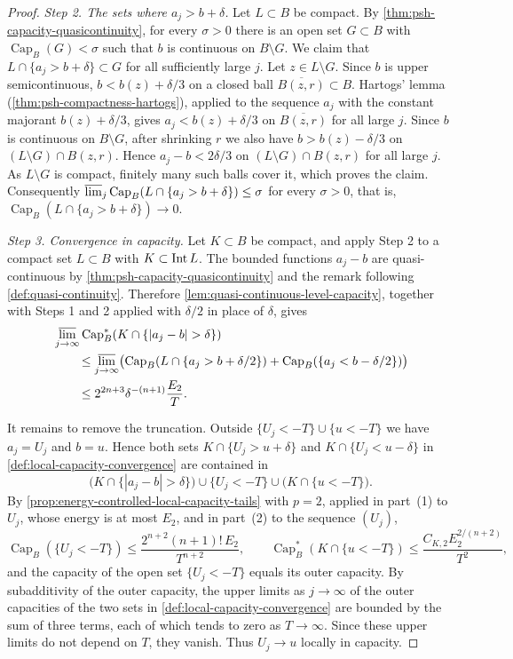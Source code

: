 \begin{proof}
\emph{Step 2. The sets where $a_j>b+\delta$.}
Let $L\subset B$ be compact. By \cref{thm:psh-capacity-quasicontinuity}, for every $\sigma>0$ there is an open set $G\subset B$ with $\operatorname{Cap}_B(G)<\sigma$ such that $b$ is continuous on $B\setminus G$. We claim that $L\cap\{a_j>b+\delta\}\subset G$ for all sufficiently large $j$. Let $z\in L\setminus G$. Since $b$ is upper semicontinuous, $b<b(z)+\delta/3$ on a closed ball $\overline{B(z,r)}\subset B$. Hartogs' lemma (\cref{thm:psh-compactness-hartogs}), applied to the sequence $a_j$ with the constant majorant $b(z)+\delta/3$, gives $a_j<b(z)+\delta/3$ on $\overline{B(z,r)}$ for all large $j$. Since $b$ is continuous on $B\setminus G$, after shrinking $r$ we also have $b>b(z)-\delta/3$ on $(L\setminus G)\cap B(z,r)$. Hence $a_j-b<2\delta/3$ on $(L\setminus G)\cap B(z,r)$ for all large $j$. As $L\setminus G$ is compact, finitely many such balls cover it, which proves the claim. Consequently $\varlimsup_j\operatorname{Cap}_B(L\cap\{a_j>b+\delta\})\leq\sigma$ for every $\sigma>0$, that is, $\operatorname{Cap}_B(L\cap\{a_j>b+\delta\})\to0$.

\emph{Step 3. Convergence in capacity.}
Let $K\subset B$ be compact, and apply Step 2 to a compact set $L\subset B$ with $K\subset\operatorname{Int} L$. The bounded functions $a_j-b$ are quasi-continuous by \cref{thm:psh-capacity-quasicontinuity} and the remark following \cref{def:quasi-continuity}. Therefore \cref{lem:quasi-continuous-level-capacity}, together with Steps 1 and 2 applied with $\delta/2$ in place of $\delta$, gives
\[
 \begin{aligned}
 &\varlimsup_{j\to\infty}\operatorname{Cap}_B^*(K\cap\{|a_j-b|>\delta\})\\
 &\qquad\leq\varlimsup_{j\to\infty}\bigl(\operatorname{Cap}_B(L\cap\{a_j>b+\delta/2\})
     +\operatorname{Cap}_B(\{a_j<b-\delta/2\})\bigr)\\
 &\qquad\leq2^{2n+3}\delta^{-(n+1)}\frac{E_2}T.
 \end{aligned}
\]

It remains to remove the truncation. Outside $\{U_j<-T\}\cup\{u<-T\}$ we have $a_j=U_j$ and $b=u$. Hence both sets $K\cap\{U_j>u+\delta\}$ and $K\cap\{U_j<u-\delta\}$ in \cref{def:local-capacity-convergence} are contained in
\[
 \bigl(K\cap\{|a_j-b|>\delta\}\bigr)\cup\{U_j<-T\}\cup\bigl(K\cap\{u<-T\}\bigr).
\]
By \cref{prop:energy-controlled-local-capacity-tails} with $p=2$, applied in part~(1) to $U_j$, whose energy is at most $E_2$, and in part~(2) to the sequence $(U_j)$,
\[
 \operatorname{Cap}_B(\{U_j<-T\})\leq\frac{2^{n+2}(n+1)!\,E_2}{T^{n+2}},\qquad
 \operatorname{Cap}_B^*(K\cap\{u<-T\})\leq\frac{C_{K,2}E_2^{2/(n+2)}}{T^2},
\]
and the capacity of the open set $\{U_j<-T\}$ equals its outer capacity. By subadditivity of the outer capacity, the upper limits as $j\to\infty$ of the outer capacities of the two sets in \cref{def:local-capacity-convergence} are bounded by the sum of three terms, each of which tends to zero as $T\to\infty$. Since these upper limits do not depend on $T$, they vanish. Thus $U_j\to u$ locally in capacity.


\end{proof}
